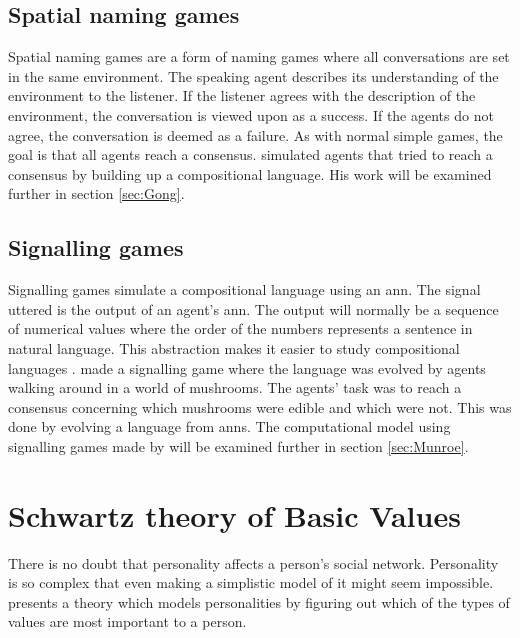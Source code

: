 \subsection{Spatial naming games}\label{SpatNamingGame}
Spatial naming games are a form of naming games where all conversations are set in the same environment. The speaking agent describes its understanding of the environment to the listener. If the listener agrees with the description of the environment, the conversation is viewed upon as a success. If the agents do not agree, the conversation is deemed as a failure. As with normal simple games, the goal is that all agents reach a consensus. \citeauthor{gong2011simulating} simulated agents that tried to reach a consensus by building up a compositional language. His work will be examined further in section \ref{sec:Gong}.

\subsection{Signalling games}
Signalling games simulate a compositional language using an \ac{ann}. The signal uttered is the output of an agent's \ac{ann}. The output will normally be a sequence of numerical values where the order of the numbers represents a sentence in natural language. This abstraction makes it easier to study compositional languages \citep{munroe2002learning, suzuki2008learning}. \citeauthor{munroe2002learning} made a signalling game where the language was evolved by agents walking around in a world of mushrooms. The agents' task was to reach a consensus concerning which mushrooms were edible and which were not. This was done by evolving a language from \acp{ann}. The computational model using signalling games made by \citeauthor{munroe2002learning} will be examined further in section \ref{sec:Munroe}.

\section{Schwartz theory of Basic Values}\label{SchwartzBasicValues}
There is no doubt that personality affects a person's social network. Personality is so complex that even making a simplistic model of it might seem impossible. \citet{schwartz1992unniversals} presents a theory which models personalities by figuring out which of the types of values are most important to a person.

